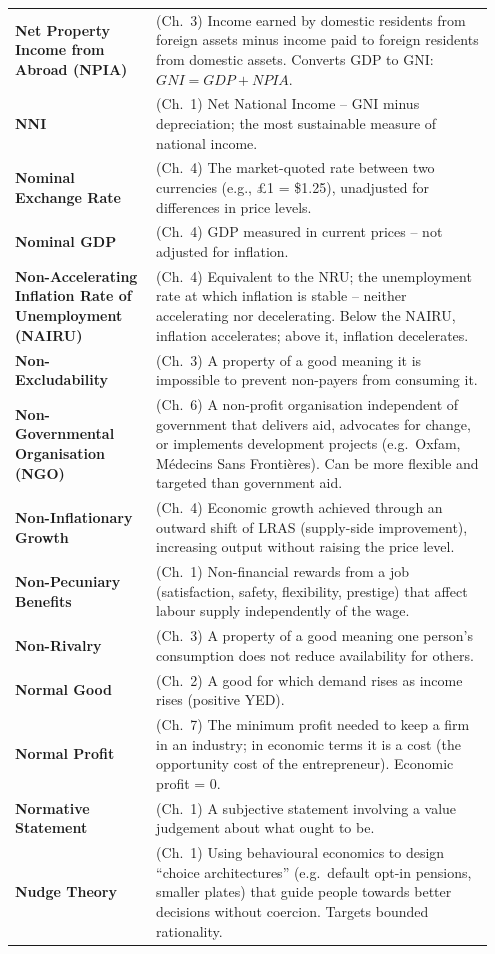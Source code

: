 \documentclass[11pt, a4paper, twoside]{book}
\begin{document}
\begin{longtable}{@{}>{\RaggedRight\arraybackslash}p{0.28\linewidth}>{\RaggedRight\arraybackslash}p{0.67\linewidth}@{}}
\textbf{Net Property Income from Abroad (NPIA)} & (Ch.~3) Income earned by domestic residents from foreign assets minus income paid to foreign residents from domestic assets. Converts GDP to GNI: $GNI = GDP + NPIA$. \\
\textbf{NNI} & (Ch.~1) Net National Income -- GNI minus depreciation; the most sustainable measure of national income. \\
\textbf{Nominal Exchange Rate} & (Ch.~4) The market-quoted rate between two currencies (e.g., £1 = \$1.25), unadjusted for differences in price levels. \\
\textbf{Nominal GDP} & (Ch.~4) GDP measured in current prices -- not adjusted for inflation. \\
\textbf{Non-Accelerating Inflation Rate of Unemployment (NAIRU)} & (Ch.~4) Equivalent to the NRU; the unemployment rate at which inflation is stable -- neither accelerating nor decelerating. Below the NAIRU, inflation accelerates; above it, inflation decelerates. \\
\textbf{Non-Excludability} & (Ch.~3) A property of a good meaning it is impossible to prevent non-payers from consuming it. \\
\textbf{Non-Governmental Organisation (NGO)} & (Ch.~6) A non-profit organisation independent of government that delivers aid, advocates for change, or implements development projects (e.g.\ Oxfam, Médecins Sans Frontières). Can be more flexible and targeted than government aid. \\
\textbf{Non-Inflationary Growth} & (Ch.~4) Economic growth achieved through an outward shift of LRAS (supply-side improvement), increasing output without raising the price level. \\
\textbf{Non-Pecuniary Benefits} & (Ch.~1) Non-financial rewards from a job (satisfaction, safety, flexibility, prestige) that affect labour supply independently of the wage. \\
\textbf{Non-Rivalry} & (Ch.~3) A property of a good meaning one person's consumption does not reduce availability for others. \\
\textbf{Normal Good} & (Ch.~2) A good for which demand rises as income rises (positive YED). \\
\textbf{Normal Profit} & (Ch.~7) The minimum profit needed to keep a firm in an industry; in economic terms it is a cost (the opportunity cost of the entrepreneur). Economic profit = 0. \\
\textbf{Normative Statement} & (Ch.~1) A subjective statement involving a value judgement about what ought to be. \\
\textbf{Nudge Theory} & (Ch.~1) Using behavioural economics to design ``choice architectures'' (e.g.\ default opt-in pensions, smaller plates) that guide people towards better decisions without coercion. Targets bounded rationality. \\


\end{longtable}
\end{document}
